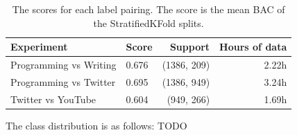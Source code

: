         \begin{table}[h]
            \centering
            \begin{tabular}{llrr}
                \toprule
                Experiment & Score & Support & Hours of data \\
                \midrule
                Programming vs Writing & 0.676 & (1386, 209) & 2.22h \\
                Programming vs Twitter & 0.695 &  (1386, 949) & 3.24h \\
                Twitter vs YouTube & 0.604 & (949, 266) & 1.69h \\
                \bottomrule
            \end{tabular}
            \caption{The scores for each label pairing. The score is the mean BAC of the StratifiedKFold splits.}\label{table:scores-natural}
        \end{table}

        The class distribution is as follows: TODO

